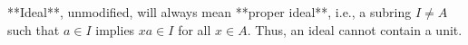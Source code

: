 **Ideal**, unmodified, will always mean **proper ideal**, i.e., a subring $I \neq A$ such that $a \in I$ implies $x a \in I$ for all $x \in A$. Thus, an ideal cannot contain a unit.
